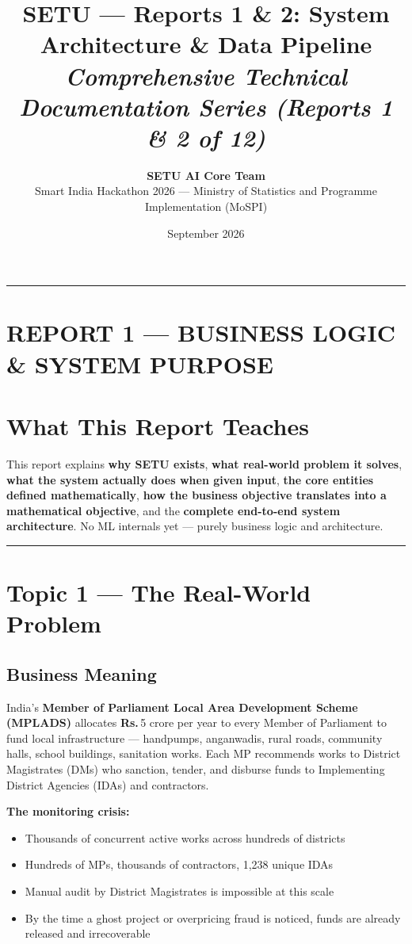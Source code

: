 \documentclass[11pt,a4paper]{article}
\title{\Large\textbf{SETU --- Reports 1 \& 2: System Architecture \& Data Pipeline}\\[0.4em]\large\textit{Comprehensive Technical Documentation Series (Reports 1 \& 2 of 12)}}
\author{\textbf{SETU AI Core Team}\\Smart India Hackathon 2026 --- Ministry of Statistics and Programme Implementation (MoSPI)}
\date{September 2026}
\DeclareRobustCommand{\INR}{\textbf{Rs.\,}}
\DeclareRobustCommand{\INR}{₹}
\begin{document}
\maketitle
\tableofcontents
\vspace{1.5em}
\hrule
\vspace{1.5em}

\clearpage
\section*{REPORT 1 --- BUSINESS LOGIC \& SYSTEM PURPOSE}

\section{What This Report Teaches}

This report explains \textbf{why SETU exists}, \textbf{what real-world problem it solves}, \textbf{what the system actually does when given input}, \textbf{the core entities defined mathematically}, \textbf{how the business objective translates into a mathematical objective}, and the \textbf{complete end-to-end system architecture}. No ML internals yet --- purely business logic and architecture.

\vspace{1em}\hrule\vspace{1em}

\section{Topic 1 --- The Real-World Problem}

\subsection{Business Meaning}

India's \textbf{Member of Parliament Local Area Development Scheme (MPLADS)} allocates \INR{}5 crore per year to every Member of Parliament to fund local infrastructure --- handpumps, anganwadis, rural roads, community halls, school buildings, sanitation works. Each MP recommends works to District Magistrates (DMs) who sanction, tender, and disburse funds to Implementing District Agencies (IDAs) and contractors.

\textbf{The monitoring crisis:}
\begin{itemize}[leftmargin=1.5em, itemsep=2pt, topsep=3pt]
\item Thousands of concurrent active works across hundreds of districts
\item Hundreds of MPs, thousands of contractors, 1,238 unique IDAs
\item Manual audit by District Magistrates is impossible at this scale
\item By the time a ghost project or overpricing fraud is noticed, funds are already released and irrecoverable
\end{itemize}
\end{document}
